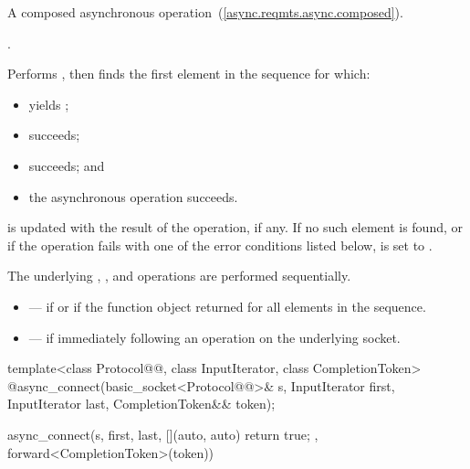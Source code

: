 \begin{itemdescr}
\pnum
A composed asynchronous operation~(\ref{async.reqmts.async.composed}).

\pnum
\completionsig {}.

\pnum
\effects Performs , then finds the first element  in the sequence  for which:
\begin{itemize}
\item
{} yields ;
\item
{} succeeds;
\item
{} succeeds; and
\item
 the asynchronous operation  succeeds.
\end{itemize}
\pnum
{} is updated with the result of the  operation, if any. If no such element is found, or if the operation fails with one of the error conditions listed below,  is set to . \begin{note} The underlying , , and  operations are performed sequentially. \end{note}

\pnum
\errors
\begin{itemize}
\item
{} --- if  or if the function object  returned  for all elements in the sequence.
\item
{} --- if  immediately following an  operation on the underlying socket.
\end{itemize}
\end{itemdescr}

\begin{itemdecl}
template<class Protocol@@, class InputIterator, class CompletionToken>
  @\DEDUCED@ async_connect(basic_socket<Protocol@@>& s,
                        InputIterator first, InputIterator last,
                        CompletionToken&& token);
\end{itemdecl}

\begin{itemdescr}
\pnum
\returns
\begin{codeblock}
async_connect(s, first, last, [](auto, auto){ return true; },
              forward<CompletionToken>(token))
\end{codeblock}
\end{itemdescr}

